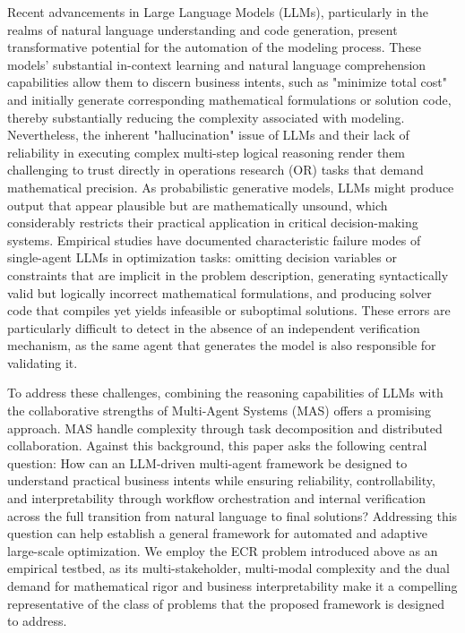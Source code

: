 \documentclass[preprint,12pt]{elsarticle}
\begin{document}
Recent advancements in Large Language Models (LLMs), particularly in the realms of natural language understanding and code generation, present transformative potential for the automation of the modeling process. These models' substantial in-context learning and natural language comprehension capabilities allow them to discern business intents, such as "minimize total cost" and initially generate corresponding mathematical formulations or solution code, thereby substantially reducing the complexity associated with modeling. Nevertheless, the inherent "hallucination" issue of LLMs and their lack of reliability in executing complex multi-step logical reasoning render them challenging to trust directly in operations research (OR) tasks that demand mathematical precision. As probabilistic generative models, LLMs might produce output that appear plausible but are mathematically unsound, which considerably restricts their practical application in critical decision-making systems. Empirical studies have documented characteristic failure modes of single-agent LLMs in optimization tasks: omitting decision variables or constraints that are implicit in the problem description, generating syntactically valid but logically incorrect mathematical formulations, and producing solver code that compiles yet yields infeasible or suboptimal solutions. These errors are particularly difficult to detect in the absence of an independent verification mechanism, as the same agent that generates the model is also responsible for validating it.

To address these challenges, combining the reasoning capabilities of LLMs with the collaborative strengths of Multi-Agent Systems (MAS) offers a promising approach. MAS handle complexity through task decomposition and distributed collaboration. Against this background, this paper asks the following central question: How can an LLM-driven multi-agent framework be designed to understand practical business intents while ensuring reliability, controllability, and interpretability through workflow orchestration and internal verification across the full transition from natural language to final solutions? Addressing this question can help establish a general framework for automated and adaptive large-scale optimization. We employ the ECR problem introduced above as an empirical testbed, as its multi-stakeholder, multi-modal complexity and the dual demand for mathematical rigor and business interpretability make it a compelling representative of the class of problems that the proposed framework is designed to address.
\end{document}
